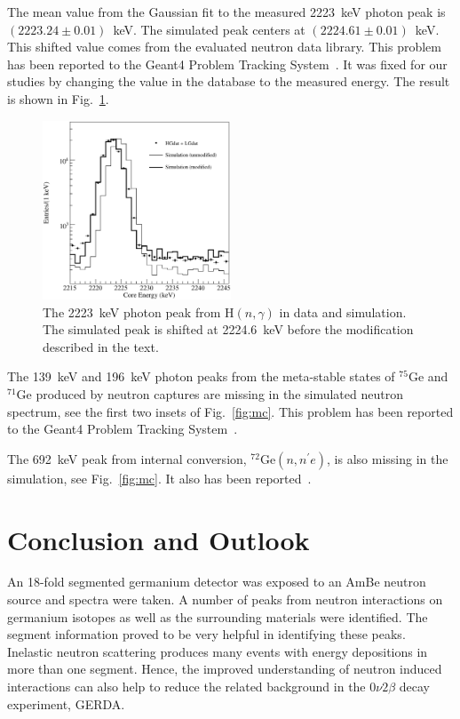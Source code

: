 \documentclass{elsart}
\begin{document}
The mean value from the Gaussian fit to the measured 2223~keV photon
peak is $(2223.24 \pm 0.01)$~keV. The simulated peak centers at
$(2224.61 \pm 0.01)$~keV. This shifted value comes from the evaluated
neutron data library. This problem has been reported to the Geant4
Problem Tracking System~\cite{g4bug2}. It was fixed for our studies by
changing the value in the database to the measured energy. The result
is shown in Fig.~\ref{fig:h2223}.

\begin{figure}[tbhp]
  \centering
  \includegraphics[width=0.5\textwidth]{h2223.eps}
  \caption{The 2223~keV photon peak from H$(n,\gamma)$ in data and
    simulation. The simulated peak is shifted at 2224.6~keV before the
    modification described in the text.}
  \label{fig:h2223}
\end{figure}

The 139~keV and 196~keV photon peaks from the meta-stable states of
$^{75}$Ge and $^{71}$Ge produced by neutron captures are missing in
the simulated neutron spectrum, see the first two insets of
Fig.~\ref{fig:mc}. This problem has been reported to the Geant4
Problem Tracking System~\cite{g4bug3}.

The 692~keV peak from internal conversion, $^{72}$Ge$(n,n^{\prime}e)$,
is also missing in the simulation, see Fig.~\ref{fig:mc}. It also has
been reported~\cite{g4bug4}.

\section{Conclusion and Outlook}
\label{sec:out}
An 18-fold segmented germanium detector was exposed to an AmBe neutron
source and spectra were taken. A number of peaks from neutron
interactions on germanium isotopes as well as the surrounding
materials were identified. The segment information proved to be very
helpful in identifying these peaks. Inelastic neutron scattering
produces many events with energy depositions in more than one
segment. Hence, the improved understanding of neutron induced
interactions can also help to reduce the related background in the
$0\nu2\beta$ decay experiment, GERDA.
\end{document}
